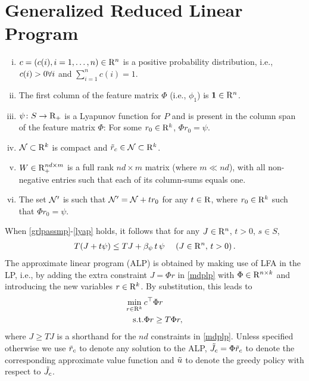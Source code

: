 \section{Generalized Reduced Linear Program}
\begin{assumption}\label{grlpassmp}
\begin{enumerate}[(i)]
\item \label{probdist} $c=(c(i),i=1,\ldots,n)\in \mathrm{R}^n$ is a positive probability distribution, i.e., $c(i)>0 \relax{ } \forall i$ and $\sum_{i=1}^n c(i)=1$.
\item  \label{one} The first column of the feature matrix $\Phi$ (i.e., $\phi_1$) is $\mathbf{1} \in \mathrm{R}^n$. 
\item \label{lyap} $\psi\colon S \rightarrow \mathrm{R}_+$ is a Lyapunov function for $P$
and is present in the column span of the feature matrix $\Phi$: For some $r_0\in \mathrm{R}^k$, $\Phi r_0 = \psi$. 
\item \label{nassmp} $\mathcal{N}\subset \mathrm{R}^k$ is compact and $\tilde{r}_c \in \mathcal{N}\subset\mathrm{R}^k$.
\item \label{wassump} $W \in \mathrm{R}^{nd\times m}_+$ is a full rank $nd\times m$ matrix (where $m\ll nd$), with all non-negative entries such that each of its column-sums equals one.
\item \label{ass:n4} The set $\mathcal{N}'$ is such that $\mathcal{N}' = \mathcal{N} + t r_0$ for any $t\in \mathrm{R}$, where $r_0\in \mathrm{R}^k$ such that $\Phi r_0 = \psi$.
\end{enumerate}
\end{assumption}
When \cref{grlpassmp}-\eqref{lyap} holds, it follows that for any $J\in \mathrm{R}^n$, $t>0$, $s\in S$,
\begin{align}
\label{eq:psilin}
T(J+ t \psi ) \le TJ + \beta_{\psi}\,t\,  \psi\,\, \quad (J\in \R^n,\, t>0)\,.
\end{align}
The approximate linear program (ALP) is obtained by making use of LFA in the LP, i.e., by adding the extra constraint $J=\Phi r$ in \eqref{mdplp} with $\Phi \in \mathrm{R}^{n\times k}$ and introducing the new variables $r\in \mathrm{R}^k$. By substitution, this leads to
\begin{align}\label{alp}
\begin{split}
\min_{r\in \R^k}\, &c^\top \Phi r\\
\text{s.t.}\mb &\Phi r\geq T \Phi r,
\end{split}
\end{align}
where $J\geq TJ$ is a shorthand for the $nd$ constraints in \eqref{mdplp}. Unless specified otherwise we use $\tilde{r}_c$ to denote any solution to the ALP, $\tilde{J}_c=\Phi \tilde{r}_c$ to denote the corresponding approximate value function and $\tilde{u}$ to denote the greedy policy with respect to $\tilde{J}_c$.

